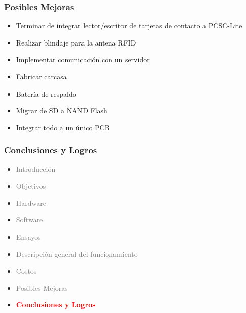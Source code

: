 \documentclass{beamer}
\begin{document}
\begin{frame}
	\frametitle{Posibles Mejoras}
	\begin{itemize}
		\item <2-> Terminar de integrar lector/escritor de tarjetas de contacto a PCSC-Lite

		\bigskip		
		\item <3-> Realizar blindaje para la antena RFID
		
		\bigskip		
		\item <4-> Implementar comunicación con un servidor
				
		\bigskip		
		\item <5-> Fabricar carcasa
		
		\bigskip		
		\item <6-> Batería de respaldo
		
		\bigskip		
		\item <7-> Migrar de SD a NAND Flash

		\bigskip		
		\item <8-> Integrar todo a un único PCB
	\end{itemize}
\end{frame}	

\begin{frame}
	\frametitle{Conclusiones y Logros}
	\begin{itemize}
		\item \textcolor{gray}{Introducción}
		\item \textcolor{gray}{Objetivos}
		\item \textcolor{gray}{Hardware}
		\item \textcolor{gray}{Software}
		\item \textcolor{gray}{Ensayos}
		\item \textcolor{gray}{Descripción general del funcionamiento}		
		\item \textcolor{gray}{Costos}
		\item \textcolor{gray}{Posibles Mejoras}
		\item \textcolor{red}{\bf{Conclusiones y Logros}}
	\end{itemize}
\end{frame}
\end{document}
